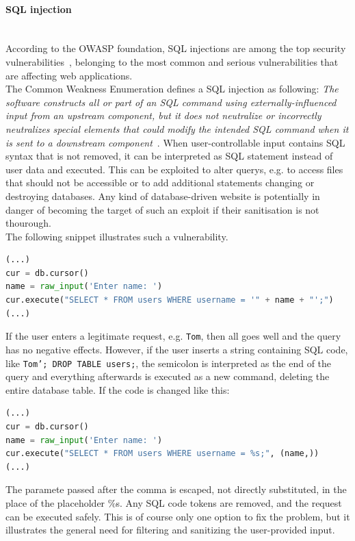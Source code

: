 \documentclass[
	a4paper,
	pagesize,
	pdftex,
	12pt,
	twoside, %
	BCOR=5mm, %
	ngerman,
	fleqn,
	final,
	]{scrartcl}
\begin{document}
\paragraph{SQL injection}\mbox{}\\
According to the OWASP foundation, SQL injections are among the top security vulnerabilities~\cite{OWASPFoundation.}, belonging to the most common and serious vulnerabilities that are affecting web applications.\\ 
The Common Weakness Enumeration defines a SQL injection as following: \textit{The software constructs all or part of an SQL command using externally-influenced input from an upstream component, but it does not neutralize or incorrectly neutralizes special elements that could modify the intended SQL command when it is sent to a downstream component}~\cite{CommonWeaknessEnumeration.19.9.2019}. When user-controllable input contains SQL syntax that is not removed, it can be interpreted as SQL statement instead of user data and executed. This can be exploited to alter querys, e.g. to access files that should not be accessible or to add additional statements changing or destroying databases. Any kind of database-driven website is potentially in danger of becoming the target of such an exploit if their sanitisation is not thourough.\\
The following snippet illustrates such a vulnerability.
\begin{lstlisting}[language=Python,showstringspaces=false]
(...)
cur = db.cursor()
name = raw_input('Enter name: ')
cur.execute("SELECT * FROM users WHERE username = '" + name + "';")
(...)
\end{lstlisting}
If the user enters a legitimate request, e.g. \texttt{Tom}, then all goes well and the query has no negative effects. However, if the user inserts a string containing SQL code, like \texttt{Tom'; DROP TABLE users;}, the semicolon is interpreted as the end of the query and everything afterwards is executed as a new command, deleting the entire database table. If the code is changed like this:
\begin{lstlisting}[language=Python,showstringspaces=false]
(...)
cur = db.cursor()
name = raw_input('Enter name: ')
cur.execute("SELECT * FROM users WHERE username = %s;", (name,))
(...)
\end{lstlisting}
The paramete passed after the comma is escaped, not directly substituted, in the place of the placeholder \%s. Any SQL code tokens are removed, and the request can be executed safely. This is of course only one option to fix the problem, but it illustrates the general need for filtering and sanitizing the user-provided input. 
\end{document}

